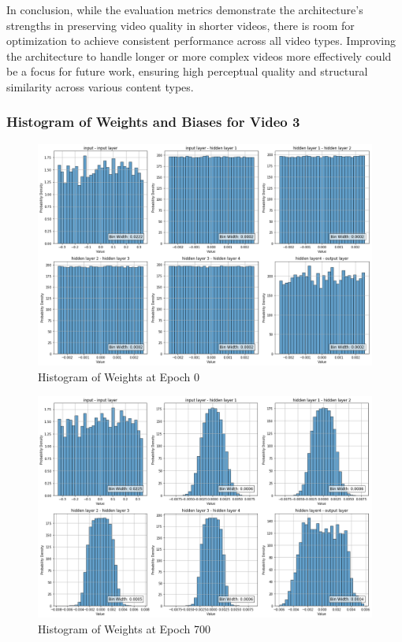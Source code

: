 \documentclass{ioereport}
\begin{document}
In conclusion, while the evaluation metrics demonstrate the architecture's strengths in preserving video quality in shorter videos, there is room for optimization to achieve consistent performance across all video types. Improving the architecture to handle longer or more complex videos more effectively could be a focus for future work, ensuring high perceptual quality and structural similarity across various content types.




\subsubsection{Histogram of Weights and Biases for Video 3}


    \begin{figure}[H]
        \centering
        \includegraphics[width=\linewidth]{assets/video histogram/epoch0Weight.png}
        \caption{Histogram of Weights at Epoch 0}
        \label{fig:video-weight-0}
    \end{figure}

    \begin{figure}[H]
        \centering
        \includegraphics[width=\linewidth]{assets/video histogram/epoch700Weight.png}
        \caption{Histogram of Weights at Epoch 700}
        \label{fig:video-weight-700}
    \end{figure}
\end{document}
